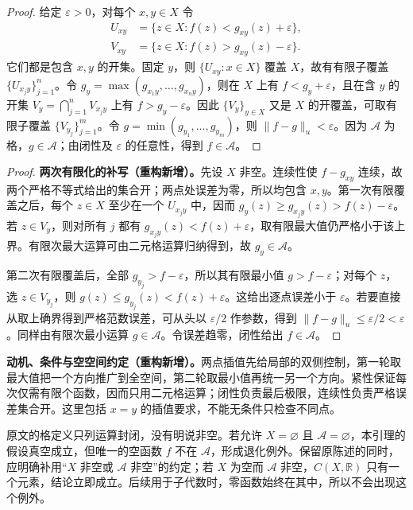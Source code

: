 \documentclass[../../main.tex]{subfiles}%
\begin{document}
\begin{proof}
给定 $\varepsilon>0$，对每个 $x,y\in X$ 令
\begin{align*}
U_{xy}&=\{z\in X:f(z)<g_{xy}(z)+\varepsilon\},\\
V_{xy}&=\{z\in X:f(z)>g_{xy}(z)-\varepsilon\}.
\end{align*}
它们都是包含 $x,y$ 的开集。固定 $y$，则 $\{U_{xy}:x\in X\}$ 覆盖 $X$，故有有限子覆盖 $\{U_{x_jy}\}_{j=1}^n$。令 $g_y=\max(g_{x_1y},\ldots,g_{x_ny})$，则在 $X$ 上有 $f<g_y+\varepsilon$，且在含 $y$ 的开集 $V_y=\bigcap_{j=1}^nV_{x_jy}$ 上有 $f>g_y-\varepsilon$。因此 $\{V_y\}_{y\in X}$ 又是 $X$ 的开覆盖，可取有限子覆盖 $\{V_{y_j}\}_{j=1}^m$。令 $g=\min(g_{y_1},\ldots,g_{y_m})$，则 $\|f-g\|_u<\varepsilon$。因为 $\mathcal A$ 为格，$g\in\mathcal A$；由闭性及 $\varepsilon$ 的任意性，得到 $f\in\mathcal A$。
\end{proof}
\begin{proof}
\textbf{两次有限化的补写（重构新增）。}先设 $X$ 非空。连续性使 $f-g_{xy}$ 连续，故两个严格不等式给出的集合开；两点处误差为零，所以均包含 $x,y$。第一次有限覆盖之后，每个 $z\in X$ 至少在一个 $U_{x_jy}$ 中，因而 $g_y(z)\ge g_{x_jy}(z)>f(z)-\varepsilon$。若 $z\in V_y$，则对所有 $j$ 都有 $g_{x_jy}(z)<f(z)+\varepsilon$，取有限最大值仍严格小于该上界。有限次最大运算可由二元格运算归纳得到，故 $g_y\in\mathcal A$。

第二次有限覆盖后，全部 $g_{y_j}>f-\varepsilon$，所以其有限最小值 $g>f-\varepsilon$；对每个 $z$，选 $z\in V_{y_j}$，则 $g(z)\le g_{y_j}(z)<f(z)+\varepsilon$。这给出逐点误差小于 $\varepsilon$。若要直接从取上确界得到严格范数误差，可从头以 $\varepsilon/2$ 作参数，得到 $\|f-g\|_u\le\varepsilon/2<\varepsilon$。同样由有限次最小运算 $g\in\mathcal A$。令误差趋零，闭性给出 $f\in\mathcal A$。
\end{proof}
\begin{remark}
\textbf{动机、条件与空空间约定（重构新增）。}两点插值先给局部的双侧控制，第一轮取最大值把一个方向推广到全空间，第二轮取最小值再统一另一个方向。紧性保证每次仅需有限个函数，因而只用二元格运算；闭性负责最后极限，连续性负责严格误差集合开。这里包括 $x=y$ 的插值要求，不能无条件只检查不同点。

原文的格定义只列运算封闭，没有明说非空。若允许 $X=\varnothing$ 且 $\mathcal A=\varnothing$，本引理的假设真空成立，但唯一的空函数 $f$ 不在 $\mathcal A$，形成退化例外。保留原陈述的同时，应明确补用“$X$ 非空或 $\mathcal A$ 非空”的约定；若 $X$ 为空而 $\mathcal A$ 非空，$C(X,\mathbb R)$ 只有一个元素，结论立即成立。后续用于子代数时，零函数始终在其中，所以不会出现这个例外。
\end{remark}
\end{document}
